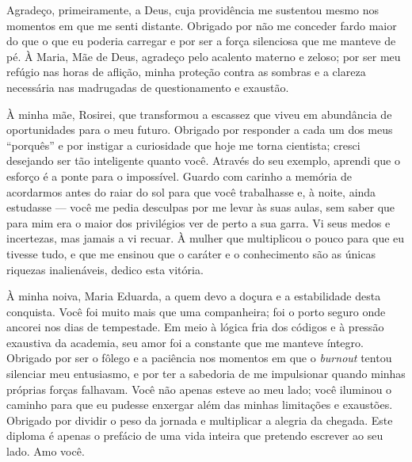\documentclass[
	12pt,		%
	a4paper,	%
	openright,  %
	oneside,	%
	chapter=TITLE,		%
	section=TITLE,		%
	english,	%
	brazilian   %
]{abntex2}
\begin{document}
%
\begin{agradecimentos}

	\par{
        Agradeço, primeiramente, a Deus, cuja providência me sustentou mesmo nos momentos em que me senti
        distante. Obrigado por não me conceder fardo maior do que o que eu poderia carregar e por ser a força
        silenciosa que me manteve de pé. À Maria, Mãe de Deus, agradeço pelo acalento materno e zeloso; por ser meu
        refúgio nas horas de aflição, minha proteção contra as sombras e a clareza necessária nas madrugadas de
        questionamento e exaustão.
    }

	\par{
        À minha mãe, Rosirei, que transformou a escassez que viveu em abundância de oportunidades para o meu
        futuro. Obrigado por responder a cada um dos meus ``porquês'' e por instigar a curiosidade que hoje me torna
        cientista; cresci desejando ser tão inteligente quanto você. Através do seu exemplo, aprendi que o esforço é
        a ponte para o impossível. Guardo com carinho a memória de acordarmos antes do raiar do sol para que você
        trabalhasse e, à noite, ainda estudasse — você me pedia desculpas por me levar às suas aulas, sem saber que
        para mim era o maior dos privilégios ver de perto a sua garra. Vi seus medos e incertezas, mas jamais a vi
        recuar. À mulher que multiplicou o pouco para que eu tivesse tudo, e que me ensinou que o caráter e o
        conhecimento são as únicas riquezas inalienáveis, dedico esta vitória.
    }

	\par{
        À minha noiva, Maria Eduarda, a quem devo a doçura e a estabilidade desta conquista. Você foi muito
        mais que uma companheira; foi o porto seguro onde ancorei nos dias de tempestade. Em meio à lógica fria dos
        códigos e à pressão exaustiva da academia, seu amor foi a constante que me manteve íntegro. Obrigado por ser
        o fôlego e a paciência nos momentos em que o \textit{burnout} tentou silenciar meu entusiasmo, e por ter a
        sabedoria de me impulsionar quando minhas próprias forças falhavam. Você não apenas esteve ao meu lado; você
        iluminou o caminho para que eu pudesse enxergar além das minhas limitações e exaustões. Obrigado por dividir
        o peso da jornada e multiplicar a alegria da chegada. Este diploma é apenas o prefácio de uma vida inteira
        que pretendo escrever ao seu lado. Amo você.
    }


\end{agradecimentos}
\end{document}
